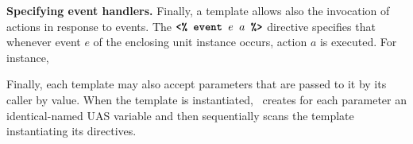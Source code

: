 
{\bf Specifying event handlers.} Finally, a template allows also the invocation of actions in response to events. The $\texttt{\textbf{<\% event }} e \texttt{\textbf{ }} a \texttt{\textbf{ \%>}}$ directive specifies that whenever event $e$ of the enclosing unit instance occurs, action $a$ is executed. For instance, \\

\costas{}

Finally, each template may also accept parameters that are passed to it by its caller by value. When the template is instantiated, \projname\ creates for each parameter an identical-named UAS variable and then sequentially scans the template instantiating its directives.

